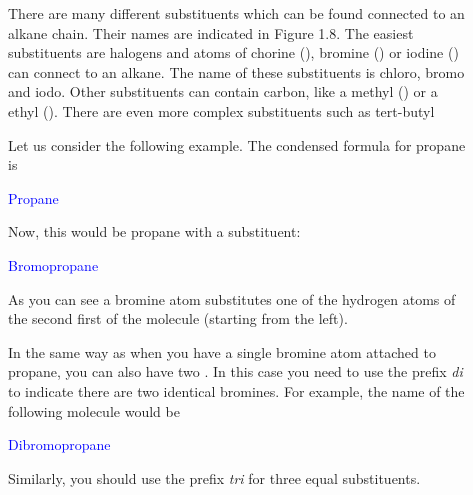 \documentclass[main.tex]{subfiles}
\begin{document}
\begin{description}

\item[] There are many different substituents which can be found connected to an alkane chain. Their names are indicated in Figure 1.8. The easiest substituents are halogens and atoms of chorine (), bromine () or iodine () can connect to an alkane. The name of these substituents is chloro, bromo and iodo. Other substituents can contain carbon, like a methyl () or a ethyl (). There are even more complex substituents such as tert-butyl




\item[] Let us consider the following example. The condensed formula for propane is
\begin{center}  \hspace{0.5cm}\textcolor{blue}{Propane}\end{center}
Now, this would be propane with a substituent:
\begin{center}  \hspace{0.5cm}\textcolor{blue}{Bromopropane}\end{center}
As you can see a bromine atom substitutes one of the hydrogen atoms of the second first of the molecule (starting from the left).

\item[] In the same way as when you have a single bromine atom attached to propane, you can also have two . In this case you need to use the prefix \emph{di} to indicate there are two identical bromines. For example, the name of the following molecule would be
\begin{center}  \hspace{0.5cm}\textcolor{blue}{Dibromopropane}\end{center}
Similarly, you should use the prefix \emph{tri} for three equal substituents.


\end{description}
\end{document}
